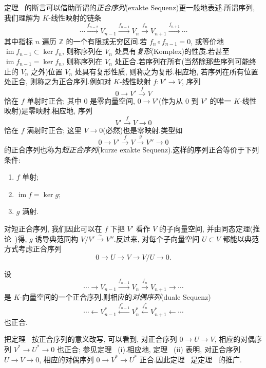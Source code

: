 定理~ 的断言可以借助所谓的\emph{正合序列}(\textup{exakte Sequenz})更一般地表述.所谓序列, 我们理解为 $K$-线性映射的链条
\[
\cdots \xrightarrow{f_{n-2}} V_{n-1} \xrightarrow{f_{n-1}} V_n \xrightarrow{f_n} V_{n+1} \xrightarrow{f_{n+1}} \cdots
\]
其中指标 $n$ 遍历 $\mathbb{Z}$ 的一个有限或无穷区间.若 $f_n \circ f_{n-1} = 0$, 或等价地 $\operatorname{im} f_{n-1} \subset \ker f_n$, 则称序列在 $V_n$ 处具有\emph{复形}(\textup{Komplex})的性质.若甚至 $\operatorname{im} f_{n-1} = \ker f_n$, 则称序列在 $V_n$ 处正合.若序列在所有(当然除那些序列可能终止的 $V_n$ 之外)位置 $V_n$ 处具有复形性质, 则称之为复形.相应地, 若序列在所有位置处正合, 则称之为正合序列.例如对 $K$-线性映射 $f \colon V' \longrightarrow V$, 序列
\[
0 \longrightarrow V' \xrightarrow{f} V
\]
恰在 $f$ 单射时正合; 其中 $0$ 是零向量空间, $0 \longrightarrow V'$(作为从 $0$ 到 $V'$ 的唯一 $K$-线性映射)是零映射.相应地, 序列
\[
V' \xrightarrow{f} V \longrightarrow 0
\]
恰在 $f$ 满射时正合; 这里 $V \longrightarrow 0$(必然)也是零映射.类型如
\[
0 \longrightarrow V' \xrightarrow{f} V \xrightarrow{g} V'' \longrightarrow 0
\]
的正合序列也称为\emph{短正合序列}(\textup{kurze exakte Sequenz}).这样的序列正合等价于下列条件:
\begin{enumerate}
\item $f$ 单射;
\item $\operatorname{im} f = \ker g$;
\item $g$ 满射.
\end{enumerate}
对短正合序列, 我们因此可以在 $f$ 下把 $V'$ 看作 $V$ 的子向量空间, 并由同态定理(推论~)得, $g$ 诱导典范同构 $V/V' \overset{\sim}{\longrightarrow} V''$.反过来, 对每个子向量空间 $U \subset V$ 都能以典范方式考虑正合序列
\[
0 \longrightarrow U \longrightarrow V \longrightarrow V/U \longrightarrow 0\text{.}
\]

\begin{theorem}\label{thm:2.3.4}
设
\[
\cdots \longrightarrow V_{n-1} \xrightarrow{f_{n-1}} V_n \xrightarrow{f_n} V_{n+1} \longrightarrow \cdots
\]
是 $K$-向量空间的一个正合序列.则相应的\emph{对偶序列}(\textup{duale Sequenz})
\[
\cdots \longleftarrow V_{n-1}^* \xleftarrow{f_{n-1}^*} V_n^* \xleftarrow{f_n^*} V_{n+1}^* \longleftarrow \cdots
\]
也正合.
\end{theorem}

把定理~ 按正合序列的意义改写, 可以看到, 对正合序列 $0 \longrightarrow U \longrightarrow V$, 相应的对偶序列 $V^* \longrightarrow U^* \longrightarrow 0$ 也正合; 参见定理~ (i).相应地, 定理~ (ii) 表明, 对正合序列 $U \longrightarrow V \longrightarrow 0$, 相应的对偶序列 $0 \longrightarrow V^* \longrightarrow U^*$ 正合.因此定理~ 是定理~ 的推广.

